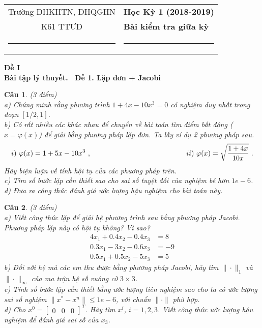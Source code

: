 \documentclass[11pt]{article}
\newtheorem{bt}{Câu}
\newcommand{\m}[1]{
	\begin{bmatrix}
		#1
	\end{bmatrix}
}
\begin{document}
\begin{tabular*}
{\linewidth}{c>{\centering\hspace{0pt}} p{}}
Trường ĐHKHTN, ĐHQGHN & {\bf Học Kỳ 1 (2018-2019)}
\tabularnewline
K61 TTƯD & {\bf Bài kiểm tra giữa kỳ}
\tabularnewline
\rule{1in}{1pt}  \small  & \rule{2in}{1pt} %
\tabularnewline

\end{tabular*}
%

\begin{center}	
\textbf{Đề I} \\
\textbf{ Bài tập lý thuyết.  \ Đề 1. Lặp đơn + Jacobi }
\end{center}

\begin{bt}(3 điểm) \\
a)	Chứng minh rằng phương trình $1+4x-10x^3=0$ có nghiệm duy nhất trong đoạn $[1/2, 1]$. \\
b)	Có rất nhiều các khác nhau để chuyển về bài toán tìm điểm bất động ($x=\varphi(x)$) để giải bằng phương pháp lặp đơn. Ta lấy ví dụ 2 phương pháp sau.
%
\[
i) \ \varphi(x) = 1+5x-10x^3 \ , \hskip 4cm \qquad ii) \ \varphi(x) = \sqrt{\dfrac{1+4x}{10x}} \ .
\]
%
Hãy biện luận về tính hội tụ của các phương pháp trên. \\
c) Tìm số bước lặp cần thiết sao cho sai số tuyệt đối của nghiệm bé hơn $1e-6$. \\
d) Đưa ra công thức đánh giá ước lượng hậu nghiệm cho bài toán này. 
\end{bt}


\begin{bt}(3 điểm) \\
	a) Viết công thức lặp để giải hệ phương trình sau bằng phương pháp Jacobi. Phương pháp lặp này có hội tụ không? Vì sao?
	\begin{align*}
	4 x_1 + 0.4 x_2 - 0.4 x_3 &= 8 \\
	0.3 x_1 - 3 x_2 - 0.6 x_3 &= -9 \\
	0.5 x_1 + 0.5 x_2 - 5 x_3 &= 5 
	\end{align*}
	b) Đối với hệ mà các em thu được bằng phương pháp Jacobi, hãy tìm $\|\cdot\|_1$ và $\|\cdot\|_{\infty}$ của ma trận hệ số vuông cỡ $3 \times 3$. \\
	c) Tính số bước lặp cần thiết bằng ước lượng tiên nghiệm sao cho ta có ước lượng sai số nghiệm $\|x^*-x^n\| \leq 1e-6$, với chuẩn $\|\cdot\|$ phù hợp. \\
	d) Cho $x^0 = \m{0 & 0 & 0}^T$. Hãy tìm $x^i$, $i=1,2,3$. Viết công thức ước lượng hậu nghiệm để đánh giá sai số của $x_3$.
\end{bt}
\end{document}

